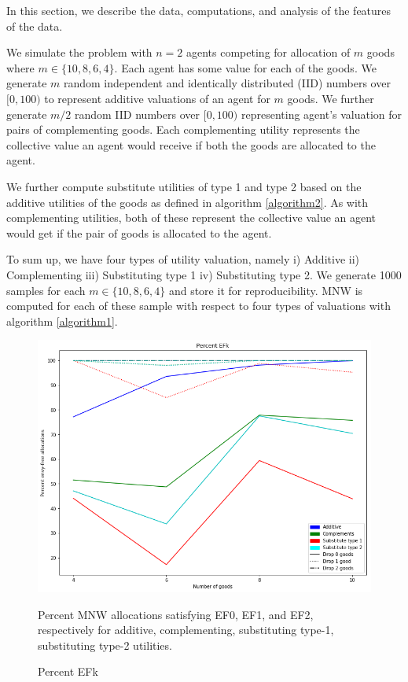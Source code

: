 In this section, we describe the data, computations, and analysis of the features of the data.

We simulate the problem with $n = 2$ agents competing for allocation of $m$ goods where $m \in \{10, 8, 6, 4\}$. Each agent has some value for each of the goods. We generate $m$ random independent and identically distributed (IID) numbers over $[0, 100)$ to represent additive valuations of an agent for $m$ goods. We further generate $m/2$ random IID numbers over $[0, 100)$ representing agent's valuation for pairs of complementing goods. Each complementing utility represents the collective value an agent would receive if both the goods are allocated to the agent.

We further compute substitute utilities of type 1 and type 2 based on the additive utilities of the goods as defined in algorithm \ref{algorithm2}. As with complementing utilities, both of these represent the collective value an agent would get if the pair of goods is allocated to the agent.

To sum up, we have four types of utility valuation, namely i) Additive ii) Complementing iii) Substituting type 1 iv) Substituting type 2. We generate 1000 samples for each $m \in \{10, 8, 6, 4\}$ and store it for reproducibility. MNW is computed for each of these sample with respect to four types of valuations with algorithm \ref{algorithm1}.


\begin{figure}[h!]
    \centering
    \includegraphics[width=\linewidth]{images/ef_percent.png}
    \caption{Percent EFk}
    \label{fig_efk_perc}
    \small
        Percent MNW allocations satisfying EF0, EF1, and EF2, respectively for additive, complementing, substituting type-1, substituting type-2 utilities.
\end{figure}

